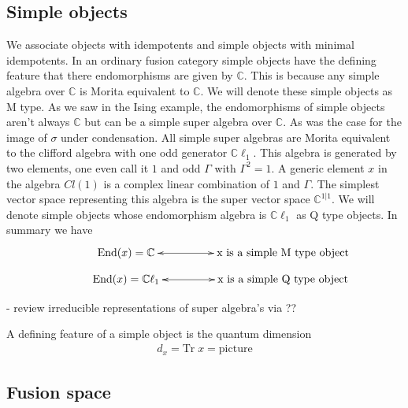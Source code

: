 \documentclass[12pt,a4paper]{article}
\begin{document}
\subsection{Simple objects}
We associate objects with idempotents and simple objects with minimal idempotents.
In an ordinary fusion category simple objects have the defining feature that there endomorphisms are given by $\mathbb{C}$.
This is because any simple algebra over $\mathbb{C}$ is Morita equivalent to $\mathbb{C}$. 
We will denote these simple objects as M type.
As we saw in the Ising example, the endomorphisms of simple objects aren't always $\mathbb{C}$ but can be a simple super algebra over $\mathbb{C}$. 
As was the case for the image of $\sigma$ under condensation.
All simple super algebras are Morita equivalent to the clifford algebra with one odd generator $\mathbb{C} \ell_1$\cite{wall1964}.
This algebra is generated by two elements, one even call it $1$ and odd $\Gamma$ with $\Gamma^2 = 1$.
A generic element $x$ in the algebra $Cl(1)$ is a complex linear combination of $1$ and $\Gamma$.
The simplest vector space representing this algebra is the super vector space $\mathbb{C}^{1|1}$.
We will denote simple objects whose endomorphism algebra is $\mathbb{C} \ell_1$ as Q type objects.
In summary we have 
\begin{align}
\vcenter{\xymatrix @!0 @M=1mm @C=25mm{
& \text{End}(x) = \mathbb{C} \ar@{<->}[rr] &   &\text{x is a simple M type object}&  \\
&\text{End}(x) = \mathbb{C} \ell_1 \ar@{<->}[rr]  &  &\text{x is a simple Q type object}&
	}}
\end{align}

$$
$$
- review irreducible representations of super algebra's via \cite{jozefiak1988}??
$$
$$

A defining feature of a simple object is the quantum dimension
\begin{align}
d_x = \text{Tr} \; x = \text{picture}
\end{align}

\subsection{Fusion space}
\end{document}
